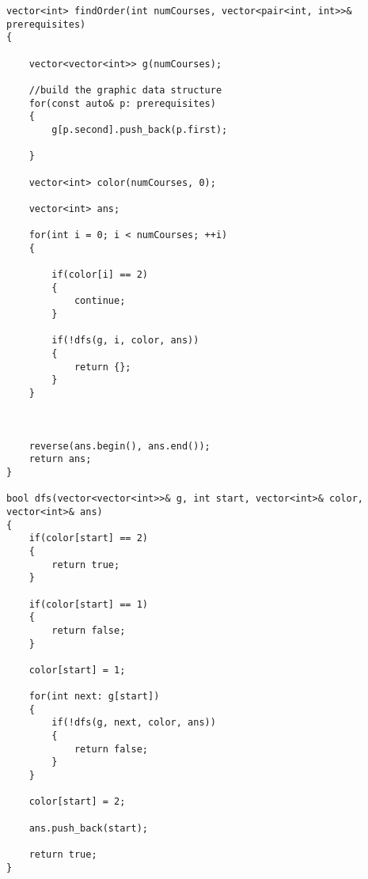\setcounter{lstlisting}{0}
\begin{lstlisting}[style=customc, caption={DFS}]
vector<int> findOrder(int numCourses, vector<pair<int, int>>& prerequisites) 
{

    vector<vector<int>> g(numCourses);

    //build the graphic data structure
    for(const auto& p: prerequisites)
    {
        g[p.second].push_back(p.first);

    }

    vector<int> color(numCourses, 0);

    vector<int> ans;

    for(int i = 0; i < numCourses; ++i)
    {

        if(color[i] == 2)
        {
            continue;
        }

        if(!dfs(g, i, color, ans))
        {
            return {};
        }
    }



    reverse(ans.begin(), ans.end());
    return ans;
}

bool dfs(vector<vector<int>>& g, int start, vector<int>& color, vector<int>& ans)
{
    if(color[start] == 2)
    {
        return true;
    }

    if(color[start] == 1)
    {
        return false;
    }

    color[start] = 1;

    for(int next: g[start])
    {
        if(!dfs(g, next, color, ans))
        {
            return false;
        }
    }

    color[start] = 2;

    ans.push_back(start);

    return true;
}
\end{lstlisting}
